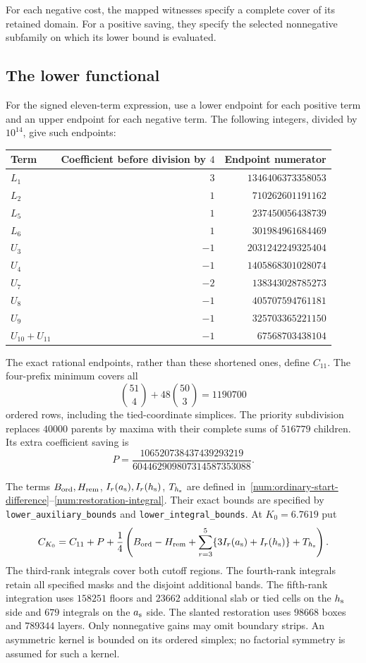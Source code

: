 For each negative cost, the mapped witnesses specify a complete
cover of its retained domain. For a positive saving, they specify
the selected nonnegative subfamily on which its lower bound is
evaluated.

\subsection{The lower functional}
For the signed eleven-term expression, use a lower endpoint for
each positive term and an upper endpoint for each negative term.
The following integers, divided by $10^{14}$, give such endpoints:
\begin{center}
\begin{tabular}{@{}l r r@{}}
\toprule Term & Coefficient before division by $4$ & Endpoint numerator\\
\midrule
$L_1$ & $3$ & $1346406373358053$\\
$L_2$ & $1$ & $710262601191162$\\
$L_5$ & $1$ & $237450056438739$\\
$L_6$ & $1$ & $301984961684469$\\
$U_3$ & $-1$ & $2031242249325404$\\
$U_4$ & $-1$ & $1405868301028074$\\
$U_7$ & $-2$ & $138343028785273$\\
$U_8$ & $-1$ & $405707594761181$\\
$U_9$ & $-1$ & $325703365221150$\\
$U_{10}+U_{11}$ & $-1$ & $67568703438104$\\
\bottomrule
\end{tabular}
\end{center}
The exact rational endpoints, rather than these shortened ones,
define $C_{11}$.  The four-prefix minimum covers all
\[
 \binom{51}{4}+48\binom{50}{3}=1190700
\]
ordered rows, including the tied-coordinate simplices.
The priority subdivision replaces $40000$ parents by maxima
with their complete sums of $516779$ children.  Its extra
coefficient saving is
\[
 P=\frac{106520738437439293219}{604462909807314587353088}.
\]

The terms $B_{\rm ord},H_{\rm rem}$, $I_r(a_{\rm s}),I_r(h_{\rm s})$, $T_{h_{\rm s}}$ are
defined in~\eqref{num:ordinary-start-difference}--\eqref{num:restoration-integral}.
Their exact bounds are
specified by \texttt{lower\_auxiliary\_bounds} and
\texttt{lower\_integral\_bounds}.  At $K_0=6.7619$ put
\[
 C_{K_0}=C_{11}+P+\frac14\left(
 B_{\rm ord}-H_{\rm rem}
 +\sum_{r=3}^5\{3I_r({a_{\rm s}})+I_r({h_{\rm s}})\}+T_{h_{\rm s}}\right).
\]
The third-rank integrals cover both cutoff regions.  The
fourth-rank integrals retain all specified masks and the
disjoint additional bands.  The fifth-rank integration uses
$158251$ floors and $23662$ additional slab or tied cells on
the ${h_{\rm s}}$ side and $679$ integrals on the ${a_{\rm s}}$ side.  The slanted
restoration uses $98668$ boxes and $789344$ layers.  Only
nonnegative gains may omit boundary strips.  An asymmetric
kernel is bounded on its ordered simplex; no factorial
symmetry is assumed for such a kernel.


